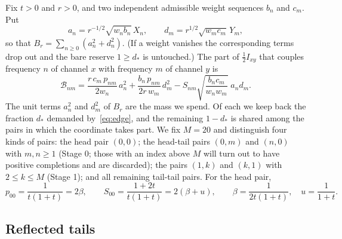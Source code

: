 \documentclass[10pt]{article}
\theoremstyle{remark}
\newcommand{\dstar}{d_{*}}
\begin{document}
Fix $t>0$ and $r>0$, and two independent admissible weight sequences $b_n$ and $c_m$. Put
\[
a_n=r^{-1/2}\sqrt{w_nb_n}\,X_n,\qquad d_m=r^{1/2}\sqrt{w_mc_m}\,Y_m,
\]
so that $B_r=\sum_{n\ge0}(a_n^2+d_n^2)$. (If a weight vanishes the corresponding terms drop out and the bare reserve $1\ge\dstar$ is untouched.) The part of $\tfrac12I_{xy}$ that couples frequency $n$ of channel $x$ with frequency $m$ of channel $y$ is
\begin{equation}\label{eq:pairblock}
\mathcal B_{nm}=\frac{r\,c_m\,p_{nm}}{2w_n}\,a_n^2+\frac{b_n\,p_{nm}}{2r\,w_m}\,d_m^2-S_{nm}\sqrt{\frac{b_nc_m}{w_nw_m}}\;a_nd_m .
\end{equation}
The unit terms $a_n^2$ and $d_m^2$ of $B_r$ are the mass we spend. Of each we keep back the fraction $\dstar$ demanded by~\eqref{eq:edge}, and the remaining $1-\dstar$ is shared among the pairs in which the coordinate takes part. We fix $M=20$ and distinguish four kinds of pairs: the head pair $(0,0)$; the head-tail pairs $(0,m)$ and $(n,0)$ with $m,n\ge1$ (Stage 0; those with an index above $M$ will turn out to have positive completions and are discarded); the pairs $(1,k)$ and $(k,1)$ with $2\le k\le M$ (Stage 1); and all remaining tail-tail pairs. For the head pair,
\[
p_{00}=\frac1{t(1+t)}=2\beta,\qquad S_{00}=\frac{1+2t}{t(1+t)}=2(\beta+u),\qquad \beta=\frac1{2t(1+t)},\quad u=\frac1{1+t}.
\]

\subsection{Reflected tails}
\end{document}

